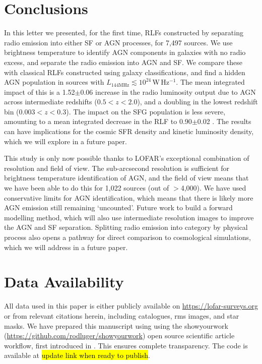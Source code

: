 \documentclass[usenatbib,fleqn,letters]{mnras}
\newcommand{\wphz}{$\,$W$\,$Hz$^{-1}$}
\newcommand{\llof}{$L_{\textrm{144MHz}}$}
\begin{document}
\section{Conclusions}
\label{sec:conclusions}
In this letter we presented, for the first time, RLFs constructed by separating radio emission into either SF or AGN processes, for 7,497 sources. We use brightness temperature to identify AGN components in galaxies with no radio excess, and separate the radio emission into AGN and SF. We compare these with classical RLFs constructed using galaxy classifications, and find a hidden AGN population in sources with \llof $\lesssim 10^{24}$\wphz . The mean integrated impact of this is a 1.52$\pm$0.06 increase in the radio luminosity output due to AGN across intermediate redshifts ($0.5 < z < 2.0$), and a doubling in the lowest redshift bin ($0.003 < z < 0.3$). The impact on the SFG population is less severe, amounting to a mean integrated decrease in the RLF to 0.90$\pm$0.02 . The results can have implications for the cosmic SFR density and kinetic luminosity density, which we will explore in a future paper. 

This study is only now possible thanks to LOFAR's exceptional combination of resolution and field of view. The sub-arcsecond resolution is sufficient for brightness temperature identification of AGN, and the field of view means that we have been able to do this for 1,022 sources (out of $>$4,000). We have used conservative limits for AGN identification, which means that there is likely more AGN emission still remaining `uncounted'. Future work to build a forward modelling method, which will also use intermediate resolution images to improve the AGN and SF separation. Splitting radio emission into category by physical process also opens a pathway for direct comparison to cosmological simulations, which we will address in a future paper. 


\section*{Data Availability}
All data used in this paper is either publicly available on \href{https://lofar-surveys.org}{https://lofar-surveys.org} or from relevant citations herein, including catalogues, rms images, and star masks. We have prepared this manuscript using using the showyourwork (\href{https://github.com/rodluger/showyourwork}{https://github.com/rodluger/showyourwork}) open source scientific article workflow, first introduced in \cite{luger_mapping_2021}. This ensures complete transparency. The code is available at \hl{update link when ready to publish}. 
\end{document}
